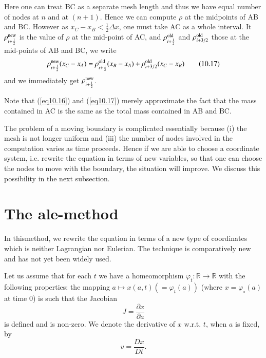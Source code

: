 Here one can treat BC as a separate mesh length and thus we have equal number of nodes at $n$ and at $(n+1)$. Hence we can compute $\rho$ at the midpoints of AB and BC. However as $x_C-x_B < \frac{1}{2} \Delta x$, one must take AC as a whole interval. It $\rho^{\rm new}_{i+\frac{1}{2}}$ is the value of $\rho$ at the mid-point of AC, and $\rho^{\rm old}_{i+\frac{1}{2}}$ and $\rho^{\rm old}_{i+3/2}$ those at the mid-points of AB and BC, we write 
\begin{equation*}
\rho^{\rm new}_{i+\frac{1}{2}} (x_C - x_A) = \rho^{\rm old}_{i+\frac{1}{2}} (x_B - x_A) + \rho^{\rm old}_{i+3/2} (x_C - x_B)\tag{10.17}\label{eq10.17}
\end{equation*}
and we immediately get $\rho^{\rm new}_{i+\frac{1}{2}}$. 

Note that (\ref{eq10.16}) and (\ref{eq10.17}) merely approximate the fact that the mass contained in AC is the same as the total mass contained in AB and BC.

The problem of a moving boundary is complicated essentially because (i) the mesh is not longer uniform and (iii) the number of nodes involved in the computation varies as time proceeds. Hence if we are able to choose a coordinate system, i.e. rewrite the equation in terms of new variables, so that one can choose the nodes to move with the boundary, the situation  will improve. We discuss this possibility in the next subsection.

\section{The ale-method\protect
  \footnotemark[1]{}}\label{chap10:sec10.4}

In this\pageoriginale method, we rewrite the equation in terms of a
new type of coordinates which is neither Lagrangian nor Eulerian. The
technique is comparatively new and has not yet been widely used.  

Let us assume that for each $t$ we have a homeomorphism $\varphi_t :
\mathbb{R} \to \mathbb{R}$ with the following properties: the mapping
$a \mapsto x(a,t) (=\varphi_t(a))$ (where $x = \varphi_\circ(a)$ at
time 0) is such that the Jacobian 
\begin{equation*} 
J = \frac{\partial x}{\partial a}\tag{10.19}\label{eq10.19}
\end{equation*}
is defined and is non-zero. We denote the derivative of $x$ w.r.t. $t$, when $a$ is fixed, by
\begin{equation*}
v= \frac{Dx}{Dt}.\tag{10.20}\label{eq10.20}
\end{equation*}

